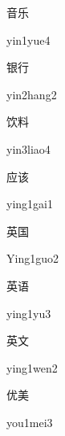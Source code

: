 \begin{verbete}{音乐}
\begin{pronuncia}{yin1yue4}
\end{pronuncia}
\end{verbete}

\begin{verbete}{银行}
\begin{pronuncia}{yin2hang2}
\end{pronuncia}
\end{verbete}

\begin{verbete}{饮料}
\begin{pronuncia}{yin3liao4}
\end{pronuncia}
\end{verbete}

\begin{verbete}{应该}
\begin{pronuncia}{ying1gai1}
\end{pronuncia}
\end{verbete}

\begin{verbete}{英国}
\begin{pronuncia}{Ying1guo2}
\end{pronuncia}
\end{verbete}

\begin{verbete}[ying1yu3]{英语}
\begin{pronuncia}{ying1yu3}
\end{pronuncia}
\end{verbete}

\begin{verbete}{英文}
\begin{pronuncia}{ying1wen2}
\end{pronuncia}
\end{verbete}

\begin{verbete}{优美}
\begin{pronuncia}{you1mei3}
\end{pronuncia}
\end{verbete}

